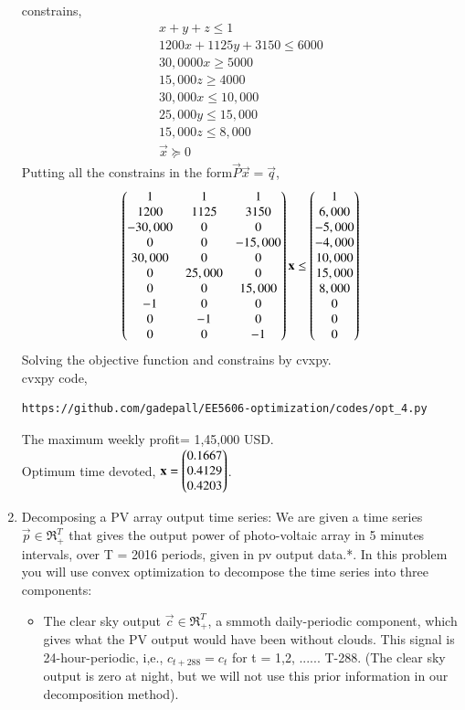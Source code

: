 \documentclass[journal,12pt,twocolumn]{IEEEtran}
\begin{document}
\begin{enumerate}
constrains,
\begin{align}
x+y+z \leq 1\\
1200x+1125y+3150 \leq 6000\\
30,0000x \geq 5000\\
15,000z \geq 4000\\
30,000x \leq 10,000\\
25,000y \leq 15,000\\
15,000z \leq 8,000\\
\vec{x}\succeq 0
\end{align}
Putting all the constrains in the form$\vec{P}\vec{x}=\vec{q}$,
\begin{align}
\begin{pmatrix}1&1&1\\1200&1125&3150\\-30,000&0&0\\0&0&-15,000\\30,000&0&0\\0&25,000&0\\0&0&15,000\\-1&0&0\\0&-1&0\\0&0&-1\end{pmatrix}\mathbf{x} \leq \begin{pmatrix}1\\6,000\\-5,000\\-4,000\\10,000\\15,000\\8,000\\0\\0\\0\end{pmatrix}
\end{align}
Solving the objective function and constrains by cvxpy.\\
cvxpy code,
\begin{lstlisting}
https://github.com/gadepall/EE5606-optimization/codes/opt_4.py
\end{lstlisting}
The maximum weekly profit= 1,45,000 USD.\\
Optimum time devoted, $\mathbf{x} = \begin{pmatrix}0.1667\\ 0.4129\\ 0.4203\end{pmatrix}$.
\item Decomposing a PV array output time series: We are given a time series  $\vec{p} \in \Re_+^T $ that gives the output power of photo-voltaic array in 5 minutes intervals, over T = 2016 periods, given in pv output data.*. In this problem you will use convex optimization to decompose the time series into three components:
\begin{itemize}
\item The clear sky output $\vec{c} \in \Re_+^T $, a smmoth daily-periodic component, which gives what the PV output would have been without clouds. This signal is 24-hour-periodic,  i,e., $c_{t+288} = c_t$ for t = 1,2, ...... T-288. (The clear sky output is zero at night, but we will not use this prior information in our decomposition method).

\end{itemize}
\end{enumerate}
\end{document}
